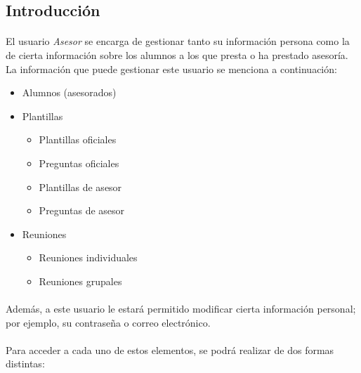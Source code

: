 \subsection{Introducción}

  \paragraph{}El usuario \textit{Asesor} se encarga de gestionar tanto su
  información persona como la de cierta información sobre los alumnos a los que
  presta o ha prestado asesoría. La información que puede gestionar este usuario
  se menciona a continuación:

  \begin{itemize}
   \item Alumnos (asesorados)
   \item Plantillas
   \begin{itemize}
      \item Plantillas oficiales
      \item Preguntas oficiales
      \item Plantillas de asesor
      \item Preguntas de asesor
   \end{itemize}
   \item Reuniones
   \begin{itemize}
      \item Reuniones individuales
      \item Reuniones grupales
   \end{itemize}
  \end{itemize}

  \paragraph{}Además, a este usuario le estará permitido modificar cierta
  información personal; por ejemplo, su contraseña o correo electrónico.

  \paragraph{}Para acceder a cada uno de estos elementos, se podrá realizar de
  dos formas distintas:

